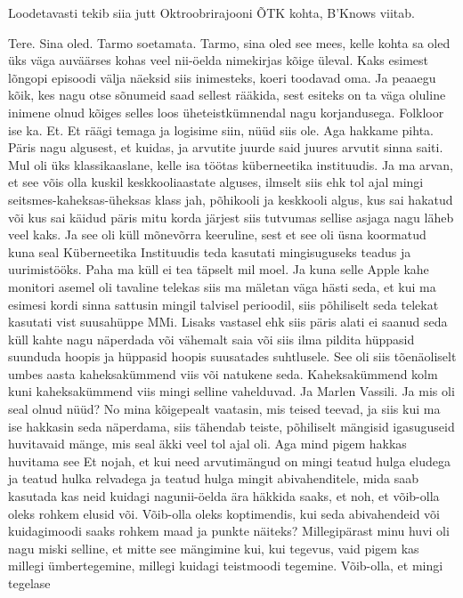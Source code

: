 

Loodetavasti tekib siia jutt Oktroobrirajooni ÕTK kohta\label{content!OTK}, B'Knows viitab.

Tere. Sina oled.
Tarmo soetamata.
Tarmo, sina oled see mees, kelle kohta sa oled üks väga auväärses kohas veel nii-öelda nimekirjas kõige üleval. Kaks esimest lõngopi episoodi välja näeksid siis inimesteks, koeri toodavad oma. Ja peaaegu kõik, kes nagu otse sõnumeid saad sellest rääkida, sest esiteks on ta väga oluline inimene olnud kõiges selles loos üheteistkümnendal nagu korjandusega. Folkloor ise ka. Et.
Et räägi temaga ja logisime siin, nüüd siis ole. Aga hakkame pihta.
Päris nagu algusest, et kuidas, ja arvutite juurde said juures arvutit sinna saiti.
Mul oli üks klassikaaslane, kelle isa töötas küberneetika instituudis.
Ja ma arvan, et see võis olla kuskil keskkooliaastate alguses, ilmselt siis ehk tol ajal mingi seitsmes-kaheksas-üheksas klass jah, põhikooli ja keskkooli algus, kus sai hakatud või kus sai käidud päris mitu korda järjest siis tutvumas sellise asjaga nagu läheb veel kaks. Ja see oli küll mõnevõrra keeruline, sest et see oli üsna koormatud kuna seal Küberneetika Instituudis teda kasutati mingisuguseks teadus ja uurimistööks. Paha ma küll ei tea täpselt mil moel. Ja kuna selle Apple kahe monitori asemel oli tavaline telekas siis ma mäletan väga hästi seda, et kui ma esimesi kordi sinna sattusin mingil talvisel perioodil, siis põhiliselt seda telekat kasutati vist suusahüppe MMi. Lisaks vastasel ehk siis päris alati ei saanud seda küll kahte nagu näperdada või vähemalt saia või siis ilma pildita hüppasid suunduda hoopis ja hüppasid hoopis suusatades suhtlusele. See oli siis tõenäoliselt umbes aasta kaheksakümmend viis või natukene seda. Kaheksakümmend kolm kuni kaheksakümmend viis mingi selline vahelduvad. Ja Marlen Vassili. Ja mis oli seal olnud nüüd?
No mina kõigepealt vaatasin, mis teised teevad, ja siis kui ma ise hakkasin seda näperdama, siis tähendab teiste, põhiliselt mängisid igasuguseid huvitavaid mänge, mis seal äkki veel tol ajal oli. Aga mind pigem hakkas huvitama see
Et nojah, et kui need arvutimängud on mingi teatud hulga eludega ja teatud hulka relvadega ja teatud hulga mingit abivahenditele, mida saab kasutada kas neid kuidagi nagunii-öelda ära häkkida saaks, et noh, et võib-olla oleks rohkem elusid või. Võib-olla oleks koptimendis, kui seda abivahendeid või kuidagimoodi saaks rohkem maad ja punkte näiteks? Millegipärast minu huvi oli nagu miski selline, et mitte see mängimine kui, kui tegevus, vaid pigem kas millegi ümbertegemine, millegi kuidagi teistmoodi tegemine. Võib-olla, et mingi tegelase
